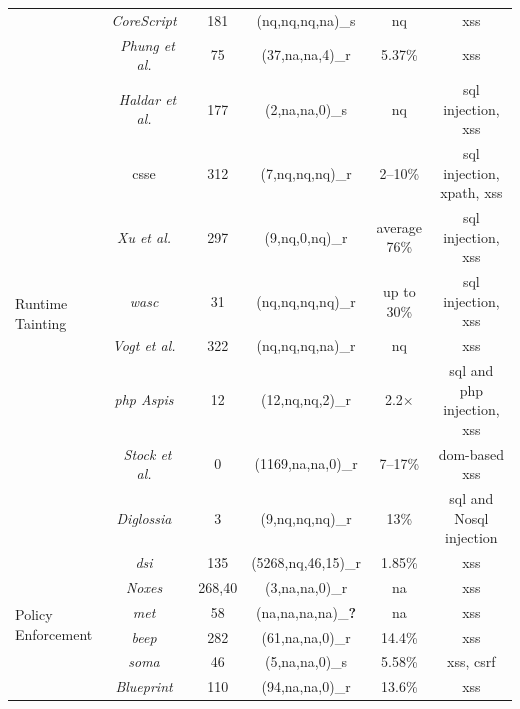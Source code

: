 \documentclass[conference]{IEEEtran}
\newcommand{\tick}{\ding{52}}
\newcommand{\xmark}{\ding{56}}
\begin{document}
\begin{landscape}
\begin{table}
\begin{threeparttable}
\begin{small}
{\begin{tabular}{l|c|c|cc|c}
  &   {\it CoreScript}~\cite{YCIS07} & 181 & ({\sc nq},{\sc nq},{\sc nq},{\sc na})\_s & {\sc nq} & {\sc xss} \\
  &   {\it Phung et al.}~\cite{PSC09} & 75 & (37,{\sc na},{\sc na},4)\_r & 5.37\% & {\sc xss} \\
  \hline
  \hline
	\multirow{8}{*}{Runtime Tainting}
  &   {\it Haldar et al.}~\cite{HCF05} & 177 & (2,{\sc na},{\sc na},0)\_s & {\sc nq} & {\sc sql} injection, {\sc xss} \\ 
	&  	{\sc csse}~\cite{PB05} & 312 & (7,{\sc nq},{\sc nq},{\sc nq})\_r & 2--10\% & {\sc sql} injection, {\sc xp}ath, {\sc xss} \\
	&  	{\it Xu et al.}~\cite{XBS06} & 297 & (9,{\sc nq},0,{\sc nq})\_r & average 76\% & {\sc sql} injection, {\sc xss} \\ 
  &  	{\it {\sc wasc}}~\cite{NLC07} & 31 & ({\sc nq},{\sc nq},{\sc nq},{\sc nq})\_r & up to 30\% & {\sc sql} injection, {\sc xss} \\
	&  	{\it Vogt et al.}~\cite{VFJKKV07} & 322 & ({\sc nq},{\sc nq},{\sc nq},{\sc na})\_r & {\sc nq} & {\sc xss} \\
	&  	{\it {\sc php} Aspis}~\cite{PMP11} & 12 & (12,{\sc nq},{\sc nq},2)\_r & 2.2$\times$ & {\sc sql} and {\sc php} injection, {\sc xss} \\
	& 	{\it Stock et al.}~\cite{SLMS14} & 0 & (1169,{\sc na},{\sc na},0)\_r & 7--17\% & {\sc dom}-based {\sc xss} \\
  &   {\it Diglossia}~\cite{SMS13} & 3 & (9,{\sc nq},{\sc nq},{\sc nq})\_r & 13\% & {\sc sql} and No{\sc sql} injection \\
  \hline
  \hline 
	\multirow{7}{*}{Policy Enforcement}
  &   {\it {\sc dsi}}~\cite{NSS06} & 135 & (5268,{\sc nq},46,15)\_r & 1.85\% & {\sc xss} \\ 
  &   {\it Noxes}~\cite{KKVJ06,KJKV09} & 268,40 & (3,{\sc na},{\sc na},0)\_r & {\sc na} & {\sc xss} \\
	&   {\it {\sc met}}~\cite{ELX07} & 58 & ({\sc na},{\sc na},{\sc na},{\sc na})\_{\bf ?} & {\sc na} & {\sc xss} \\ 
  &   {\it {\sc beep}}~\cite{TNH07} & 282 & (61,{\sc na},{\sc na},0)\_r & 14.4\% & {\sc xss} \\
  &   {\it {\sc soma}}~\cite{OWVS08} & 46 & (5,{\sc na},{\sc na},0)\_s & 5.58\% & {\sc xss}, {\sc csrf}\\
	&   {\it Blueprint}~\cite{LV09} & 110 & (94,{\sc na},{\sc na},0)\_r & 13.6\% & {\sc xss} \\ 

\end{tabular}}
\end{small}
\end{threeparttable}
\end{table}
\end{landscape}
\end{document}
